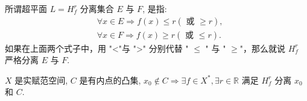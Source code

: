 \documentclass[lang=cn,newtx,10pt,scheme=chinese,thmcnt=chapter]{elegantbook}
\begin{document}
\begin{definition}
所谓超平面 $L=H_f^r$ 分离集合 $E$ 与 $F$, 是指:
\begin{equation*}
\begin{aligned}
& \forall x \in E \Longrightarrow f(x) \leqslant r(\text { 或 } \geqslant r), \\
& \forall x \in F \Longrightarrow f(x) \geqslant r(\text { 或 } \leqslant r) .
\end{aligned}
\end{equation*}
如果在上面两个式子中，用 "<"与 ">" 分别代替 " $\leqslant$ " 与 " $\geqslant$"，那么就说 $H_f^r$ 严格分离 $E$ 与 $F$.
\end{definition}
\begin{theorem}
$X$ 是实赋范空间, $C$ 是有内点的凸集, $x_0 \notin C \Rightarrow \exists f \in X^*, \exists r \in \mathbb{R}$ 满足 $H_f^r$ 分离 $x_0$ 和 $C$.
\end{theorem}
\end{document}
